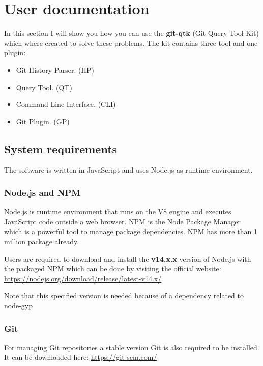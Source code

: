 \chapter{User documentation}
\label{ch:user}

In this section I will show you how you can use the \textbf{git-qtk} (Git Query Tool Kit) which where created to solve these problems. 
The kit contains three tool and one plugin:

\begin{itemize}
\item Git History Parser. (HP)
\item Query Tool. (QT)
\item Command Line Interface. (CLI)
\item Git Plugin. (GP)
\end{itemize}

\section{System requirements}
The software is written in JavaScript and uses Node.js\cite{node.js} as runtime environment.

\subsection{Node.js and NPM}
Node.js is runtime environment that runs on the V8 engine and executes JavaScript code outside a web browser. 
NPM is the Node Package Manager which is a powerful tool to manage package dependencies. NPM has more than 1 million package\cite{npm-count} already. \newline

Users are required to download and install the \textbf{v14.x.x} version of Node.js with the packaged NPM which can be done by visiting the official website:\newline
\url{https://nodejs.org/download/release/latest-v14.x/}
\newline 

Note that this specified version is needed because of a dependency related to node-gyp\cite{node-gyp-14}
 
\subsection{Git}
For managing Git repositories a stable version Git is also required to be installed. It can be downloaded here:\newline 
\url{https://git-scm.com/}
 
